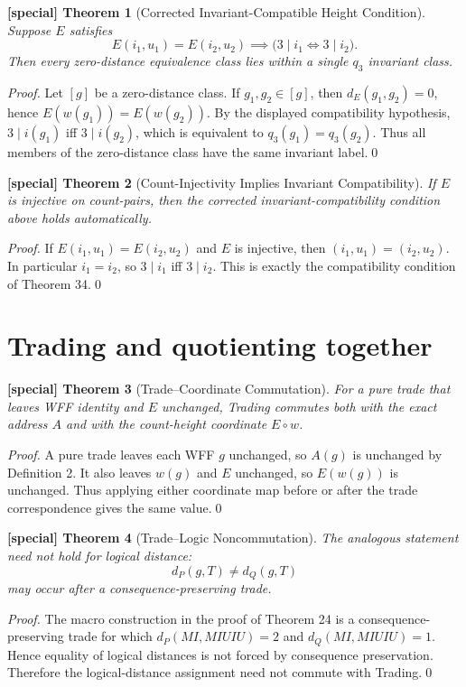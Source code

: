 \documentclass[11pt]{article}
\newtheorem{spthm}{[special] Theorem}
\begin{document}
\begin{spthm}[Corrected Invariant-Compatible Height Condition]
Suppose $E$ satisfies
\[
E(i_1,u_1)=E(i_2,u_2)
\implies
\bigl(3\mid i_1\iff 3\mid i_2\bigr).
\]
Then every zero-distance equivalence class lies within a single $q_3$ invariant class.
\end{spthm}
\textit{Proof.} Let $[g]$ be a zero-distance class. If $g_1,g_2\in[g]$, then $d_E(g_1,g_2)=0$, hence $E(w(g_1))=E(w(g_2))$. By the displayed compatibility hypothesis, $3\mid i(g_1)$ iff $3\mid i(g_2)$, which is equivalent to $q_3(g_1)=q_3(g_2)$. Thus all members of the zero-distance class have the same invariant label.\qed


\begin{spthm}[Count-Injectivity Implies Invariant Compatibility]
If $E$ is injective on count-pairs, then the corrected invariant-compatibility condition above holds automatically.
\end{spthm}
\textit{Proof.} If $E(i_1,u_1)=E(i_2,u_2)$ and $E$ is injective, then $(i_1,u_1)=(i_2,u_2)$. In particular $i_1=i_2$, so $3\mid i_1$ iff $3\mid i_2$. This is exactly the compatibility condition of Theorem 34.\qed

\section{Trading and quotienting together}
\begin{spthm}[Trade--Coordinate Commutation]
For a pure trade that leaves WFF identity and $E$ unchanged, Trading commutes both with the exact address $A$ and with the count-height coordinate $E\circ w$.
\end{spthm}
\textit{Proof.} A pure trade leaves each WFF $g$ unchanged, so $A(g)$ is unchanged by Definition 2. It also leaves $w(g)$ and $E$ unchanged, so $E(w(g))$ is unchanged. Thus applying either coordinate map before or after the trade correspondence gives the same value.\qed

\begin{spthm}[Trade--Logic Noncommutation]
The analogous statement need not hold for logical distance:
\[d_P(g,T)\ne d_Q(g,T)\]
may occur after a consequence-preserving trade.
\end{spthm}
\textit{Proof.} The macro construction in the proof of Theorem 24 is a consequence-preserving trade for which $d_P(MI,MIUIU)=2$ and $d_Q(MI,MIUIU)=1$. Hence equality of logical distances is not forced by consequence preservation. Therefore the logical-distance assignment need not commute with Trading.\qed
\end{document}

